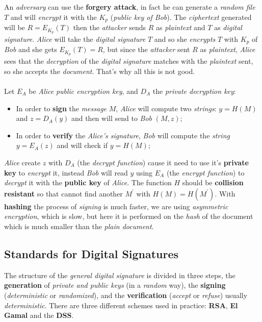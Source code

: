 \documentclass{article}
\begin{document}
An \emph{adversary} can use the \textbf{forgery attack}, in fact he can generate a \emph{random file} $T$ and will \emph{encrypt} it with the $K_p$ (\emph{public key of Bob}). The \emph{ciphertext} generated will be $R= E_{K_p}(T)$ then the \emph{attacker} sends $R$ as \emph{plaintext} and $T$ as \emph{digital signature}. \emph{Alice} will take the \emph{digital signature} $T$ and so she \emph{encrypts} $T$ with $K_p$ of \emph{Bob} and she gets $E_{K_p}(T) = R$, but since the \emph{attacker} sent $R$ as \emph{plaintext}, \emph{Alice} sees that the \emph{decryption} of the \emph{digital signature} matches with the \emph{plaintext} sent, so she accepts the \emph{document}. That’s why all this is not good.\\\\
Let $E_A$ be \emph{Alice} \emph{public encryption key}, and $D_A$ the \emph{private decryption key}: 
\begin{itemize}
\item In order to \textbf{sign} the \emph{message} $M$, \emph{Alice} will compute two \emph{strings}: $y=H(M)$ and $z=D_A(y)$ and then will send to \emph{Bob} $(M,z)$;
\item In order to \textbf{verify} the \emph{Alice's signature}, \emph{Bob} will compute the \emph{string} $y= E_A(z)$ and will check if $y=H(M)$;
\end{itemize}
\emph{Alice} create $z$ with $D_A$ (the \emph{decrypt function}) cause it need to use it's \textbf{private key} to \emph{encrypt} it, instead \emph{Bob} will read $y$ using $E_A$ (the \emph{encrypt function}) to \emph{decrypt} it with the \textbf{public key} of \emph{Alice}. The function $H$ should be \textbf{collision resistant} so that cannot find another $M^{'}$ with $H(M) = H(M^{'})$. With \textbf{hashing} the process of \emph{signing} is much faster, we are using \emph{asymmetric encryption}, which is slow, but here it is performed on the \emph{hash} of the document which is much smaller than the \emph{plain document}. 
\subsection{Standards for Digital Signatures}
The structure of the \emph{general digital signature} is divided in three steps, the \textbf{generation} of \emph{private and public keys} (in a \emph{random} way), the \textbf{signing} (\emph{deterministic} or \emph{randomized}), and the \textbf{verification} (\emph{accept} or \emph{refuse}) usually \emph{deterministic}. There are three different schemes used in practice: \textbf{RSA}, \textbf{El Gamal} and the \textbf{DSS}.
\end{document}
